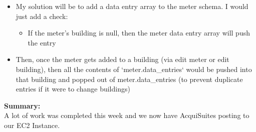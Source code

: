 \begin{adjustwidth}{2.5em}{0pt}
\begin{itemize}
	\item  My solution will be to add a data entry array to the meter schema. I would just add a check: 
	\begin{itemize}
		\item If the meter's building is null, then the meter data entry array will push the entry
	\end{itemize}
	\item Then, once the meter gets added to a building (via edit meter or edit building), then all the contents of `meter.data_entries` would be pushed into that building and popped out of meter.data_entries (to prevent duplicate entries if it were to change buildings) 
  \end{itemize}
  \vspace{-0.3cm}\noindent\textbf{Summary:}\\
    \noindent A lot of work was completed this week and we now have AcquiSuites posting to our EC2 Instance.
\end{adjustwidth} 
